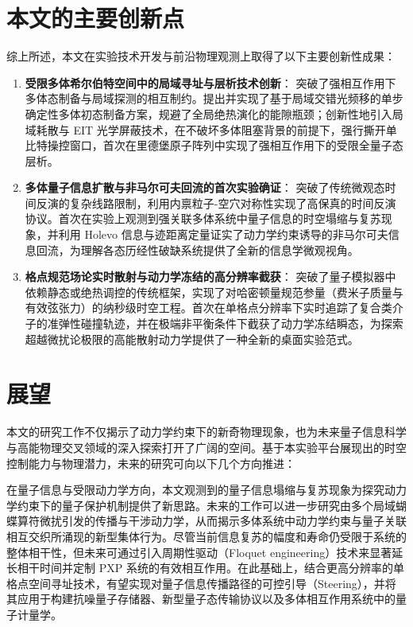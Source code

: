 \documentclass[../main.tex]{subfiles}
\begin{document}
\section{本文的主要创新点}
\label{ch8:sec:innovations}

综上所述，本文在实验技术开发与前沿物理观测上取得了以下主要创新性成果：

\begin{enumerate}
    \item \textbf{受限多体希尔伯特空间中的局域寻址与层析技术创新}：
    突破了强相互作用下多体态制备与局域探测的相互制约。提出并实现了基于局域交错光频移的单步确定性多体初态制备方案，规避了全局绝热演化的能隙瓶颈；创新性地引入局域耗散与 EIT 光学屏蔽技术，在不破坏多体阻塞背景的前提下，强行撕开单比特操控窗口，首次在里德堡原子阵列中实现了强相互作用下的受限全量子态层析。
    \item \textbf{多体量子信息扩散与非马尔可夫回流的首次实验确证}：
    突破了传统微观态时间反演的复杂线路限制，利用内禀粒子-空穴对称性实现了高保真的时间反演协议。首次在实验上观测到强关联多体系统中量子信息的时空塌缩与复苏现象，并利用 Holevo 信息与迹距离定量证实了动力学约束诱导的非马尔可夫信息回流，为理解各态历经性破缺系统提供了全新的信息学微观视角。
    \item \textbf{格点规范场论实时散射与动力学冻结的高分辨率截获}：
    突破了量子模拟器中依赖静态或绝热调控的传统框架，实现了对哈密顿量规范参量（费米子质量与有效弦张力）的纳秒级时空工程。首次在单格点分辨率下实时追踪了复合类介子的准弹性碰撞轨迹，并在极端非平衡条件下截获了动力学冻结瞬态，为探索超越微扰论极限的高能散射动力学提供了一种全新的桌面实验范式。
\end{enumerate}

\section{展望}
\label{ch8:sec:outlook}

本文的研究工作不仅揭示了动力学约束下的新奇物理现象，也为未来量子信息科学与高能物理交叉领域的深入探索打开了广阔的空间。基于本实验平台展现出的时空控制能力与物理潜力，未来的研究可向以下几个方向推进：

在量子信息与受限动力学方向，本文观测到的量子信息塌缩与复苏现象为探究动力学约束下的量子保护机制提供了新思路。未来的工作可以进一步研究由多个局域蝴蝶算符微扰引发的传播与干涉动力学，从而揭示多体系统中动力学约束与量子关联相互交织所涌现的新型集体行为。尽管当前信息复苏的幅度和寿命仍受限于系统的整体相干性，但未来可通过引入周期性驱动（Floquet engineering）技术来显著延长相干时间并定制 PXP 系统的有效相互作用。在此基础上，结合更高分辨率的单格点空间寻址技术，有望实现对量子信息传播路径的可控引导（Steering），并将其应用于构建抗噪量子存储器、新型量子态传输协议以及多体相互作用系统中的量子计量学。
\end{document}
